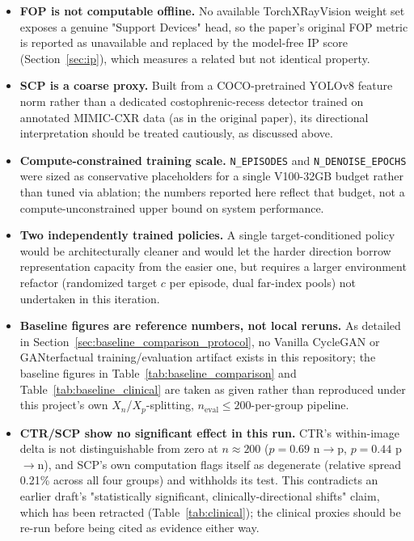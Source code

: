 \documentclass[11pt]{article}
\begin{document}
\begin{itemize}[leftmargin=*]
  \item \textbf{FOP is not computable offline.} No available
        TorchXRayVision weight set exposes a genuine "Support Devices"
        head, so the paper's original FOP metric is reported as
        unavailable and replaced by the model-free IP score
        (Section~\ref{sec:ip}), which measures a related but not
        identical property.
  \item \textbf{SCP is a coarse proxy.} Built from a COCO-pretrained
        YOLOv8 feature norm rather than a dedicated costophrenic-recess
        detector trained on annotated MIMIC-CXR data (as in the original
        paper), its directional interpretation should be treated
        cautiously, as discussed above.
  \item \textbf{Compute-constrained training scale.} \texttt{N\_EPISODES}
        and \texttt{N\_DENOISE\_EPOCHS} were sized as conservative
        placeholders for a single V100-32GB budget rather than tuned via
        ablation; the numbers reported here reflect that budget, not a
        compute-unconstrained upper bound on system performance.
  \item \textbf{Two independently trained policies.} A single
        target-conditioned policy would be architecturally cleaner and
        would let the harder direction borrow representation capacity
        from the easier one, but requires a larger environment refactor
        (randomized target $c$ per episode, dual far-index pools) not
        undertaken in this iteration.
  \item \textbf{Baseline figures are reference numbers, not local
        reruns.} As detailed in Section~\ref{sec:baseline_comparison_protocol},
        no Vanilla CycleGAN or GANterfactual training/evaluation artifact
        exists in this repository; the baseline figures in
        Table~\ref{tab:baseline_comparison} and
        Table~\ref{tab:baseline_clinical} are taken as given rather than
        reproduced under this project's own $X_n$/$X_p$-splitting,
        $n_{\text{eval}} \le 200$-per-group pipeline.
  \item \textbf{CTR/SCP show no significant effect in this run.} CTR's
        within-image delta is not distinguishable from zero at
        $n\!\approx\!200$ ($p=0.69$ n$\to$p, $p=0.44$ p$\to$n), and SCP's
        own computation flags itself as degenerate (relative spread
        0.21\% across all four groups) and withholds its test. This
        contradicts an earlier draft's "statistically significant,
        clinically-directional shifts" claim, which has been retracted
        (Table~\ref{tab:clinical}); the clinical proxies should be
        re-run before being cited as evidence either way.
\end{itemize}
\end{document}
